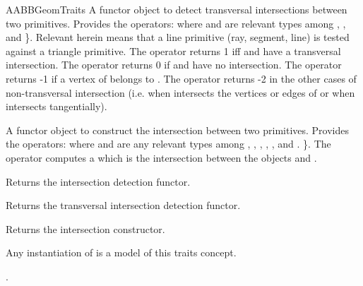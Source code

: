 \begin{ccRefConcept}{AABBGeomTraits}
{A functor object to detect transversal intersections between two primitives.
Provides the operators:
where  and  are relevant types
among , ,  and  \}. Relevant herein means that a line primitive (ray, segment, line) is tested against a triangle primitive. The operator returns 1 iff  and  have a transversal intersection. The operator returns 0 if  and  have no intersection. The operator returns -1 if a vertex of  belongs to . The operator returns -2 in the other cases of non-transversal intersection (i.e. when  intersects the vertices or edges of  or when  intersects  tangentially).}

{A functor object to construct the intersection between two primitives.
Provides the operators:
 where  and  are any relevant types among , , ,  , ,  and . \}. The operator computes a  which is the intersection between the objects  and .}

\ccCreation
{}  %

\ccOperations

{Returns the intersection detection functor.}

{Returns the transversal intersection detection functor.}

{Returns the intersection constructor.}

\ccHasModels
Any instantiation of  is a model of this traits concept.

\ccSeeAlso

.

\end{ccRefConcept}

\ccRefPageEnd

